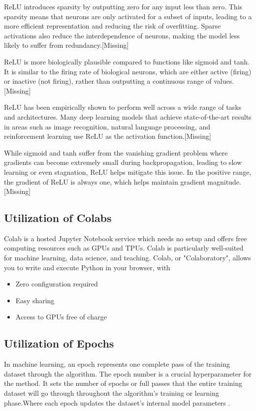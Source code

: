 \documentclass[conference]{IEEEtran}
\begin{document}
ReLU introduces sparsity by outputting zero for any input less than zero. This sparsity means that neurons are only activated for a subset of inputs, leading to a more efficient representation and reducing the risk of overfitting. Sparse activations also reduce the interdependence of neurons, making the model less likely to suffer from redundancy.[Missing]

ReLU is more biologically plausible compared to functions like sigmoid and tanh. It is similar to the firing rate of biological neurons, which are either active (firing) or inactive (not firing), rather than outputting a continuous range of values.[Missing]

ReLU has been empirically shown to perform well across a wide range of tasks and architectures. Many deep learning models that achieve state-of-the-art results in areas such as image recognition, natural language processing, and reinforcement learning use ReLU as the activation function.[Missing]

While sigmoid and tanh suffer from the vanishing gradient problem where gradients can become extremely small during backpropagation, leading to slow learning or even stagnation, ReLU helps mitigate this issue. In the positive range, the gradient of ReLU is always one, which helps maintain gradient magnitude.[Missing]

\subsection{Utilization of Colabs}
Colab is a hosted Jupyter Notebook service which needs no setup and offers free computing resources such as GPUs and TPUs. Colab is particularly well-suited for machine learning, data science, and teaching.
Colab, or "Colaboratory", allows you to write and execute Python in your browser, with
\begin{itemize}
    \item Zero configuration required
    \item Easy sharing
    \item Access to GPUs free of charge
\end{itemize}
\subsection{Utilization of Epochs}
In machine learning, an epoch represents one complete pass of the training dataset through the algorithm. The epoch number is a crucial hyperparameter for the method. It sets the number of epochs or full passes that the entire training dataset will go through throughout the algorithm's training or learning phase.Where each epoch updates the dataset's internal model parameters \cite{b8}.
\end{document}
